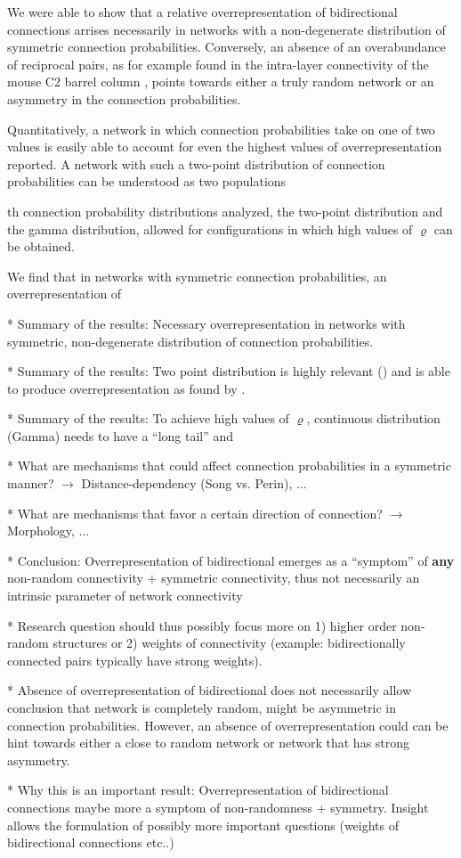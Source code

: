 
We were able to show that a relative overrepresentation of bidirectional connections arrises necessarily in networks with a non-degenerate distribution of symmetric connection probabilities. Conversely, an absence of an overabundance of reciprocal pairs, as for example found in the intra-layer connectivity of the mouse C2 barrel column \cite{Lefort2009}, points towards either a truly random network or an asymmetry in the connection probabilities. 


Quantitatively, a network in which connection probabilities take on one of two values is easily able to account for even the highest values of overrepresentation reported. A network with such a two-point distribution of connection probabilities can be understood as two populations 

th connection probability distributions analyzed, the two-point distribution and the gamma distribution, allowed for configurations in which high values of $\varrho$ can be obtained. 


We find that in networks with symmetric connection probabilities, an overrepresentation of 

* Summary of the results: Necessary overrepresentation in networks with symmetric, non-degenerate distribution of connection probabilities.

* Summary of the results: Two point distribution is highly relevant (\cite{Lee2016}) and is able to produce overrepresentation as found by \cite{Song2005}.

* Summary of the results: To achieve high values of $\varrho$, continuous distribution (Gamma) needs to have a \enquote{long tail} and 

* What are mechanisms that could affect connection probabilities in a symmetric manner? $\rightarrow$ Distance-dependency (Song vs. Perin), ...

* What are mechanisms that favor a certain direction of connection? $\rightarrow$ Morphology, ...

* Conclusion: Overrepresentation of bidirectional emerges as a \enquote{symptom} of \textbf{any} non-random connectivity $+$ symmetric connectivity, thus not necessarily an intrinsic parameter of network connectivity

* Research question should thus possibly focus more on 1) higher order non-random structures or 2) weights of connectivity (example: bidirectionally connected pairs typically have strong weights). 

* Absence of overrepresentation of bidirectional does not necessarily allow conclusion that network is completely random, might be asymmetric in connection probabilities. However, an absence of overrepresentation could can be hint towards either a close to random network or network that has strong asymmetry.


* Why this is an important result: Overrepresentation of bidirectional connections maybe more a symptom of non-randomness + symmetry. Insight allows the formulation of possibly more important questions (weights of bidirectional connections etc..)
